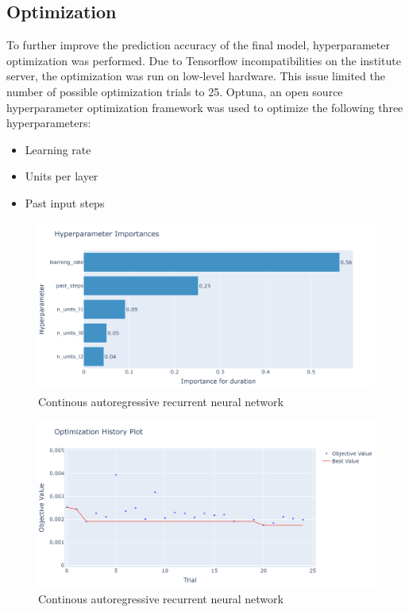 \documentclass[11pt,table]{article}
\begin{document}
\subsection{Optimization}
To further improve the prediction accuracy of the final model, hyperparameter optimization was performed. Due to Tensorflow incompatibilities on the institute server, the optimization was run on low-level hardware. This issue limited the number of possible optimization trials to 25. Optuna, an open source hyperparameter optimization framework was used to optimize the following three hyperparameters: 
\begin{itemize}
\item Learning rate
\item Units per layer
\item Past input steps
\end{itemize}

\begin{figure}[H]
	\centering
	\includegraphics[scale=0.8]{Figures/optimImportance.png}
	\caption{Continous autoregressive recurrent neural network}
	\label{fig:continousARNN}
\end{figure}

\begin{figure}[H]
	\centering
	\includegraphics[scale=0.8]{Figures/optimHistory.png}
	\caption{Continous autoregressive recurrent neural network}
	\label{fig:continousARNN}
\end{figure}
\end{document}

